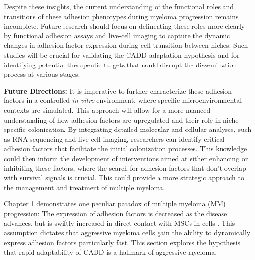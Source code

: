 Despite these insights, the current understanding of the functional roles and
transitions of these adhesion phenotypes during myeloma progression remains
incomplete. Future research should focus on delineating these roles more clearly
by functional adhesion assays and live-cell imaging to capture the dynamic
changes in adhesion factor expression during cell transition between niches.
Such studies will be crucial for validating the \ac{CADD} adaptation hypothesis
and for identifying potential therapeutic targets that could disrupt the
dissemination process at various stages.

\textbf{Future Directions:} It is imperative to further characterize these
adhesion factors in a controlled \textit{in vitro} environment, where specific
microenvironmental contexts are simulated. This approach will allow for a more
nuanced understanding of how adhesion factors are upregulated and their role in
niche-specific colonization. By integrating detailed molecular and cellular
analyses, such as RNA sequencing and live-cell imaging, researchers can identify
critical adhesion factors that facilitate the initial colonization processes.
This knowledge could then inform the development of interventions aimed at
either enhancing or inhibiting these factors, where the search for adhesion
factors that don't overlap with survival signals is crucial. This could provide
a more strategic approach to the management and treatment of multiple myeloma.






\unnsubsection{\caddadaptabilitytitle}%
\label{sec:discussion_caddadaptability}%
Chapter 1 demonstrates one peculiar paradox of multiple myeloma
(MM) progression: The expression of adhesion factors is decreased as the
disease advances, but is swiftly increased in direct contact with \acp{MSC}
in \INA cells .
This assumption dictates that aggressive myeloma cells gain the ability to
dynamically express adhesion factors particularly fast. This section explores
the hypothesis that rapid adaptability of \ac{CADD} is a hallmark of
aggressive myeloma.

